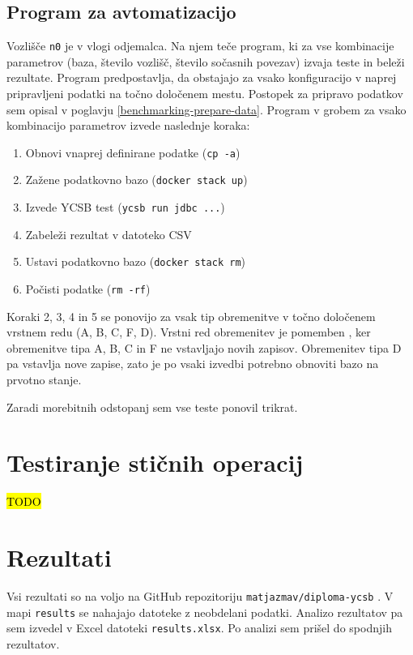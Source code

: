\documentclass[a4paper, 12pt]{book}
\begin{document}
\subsection{Program za avtomatizacijo}
Vozlišče \texttt{n0} je v vlogi odjemalca. Na njem teče program, ki za vse kombinacije parametrov (baza, število vozlišč, število sočasnih povezav) izvaja teste in beleži rezultate. Program predpostavlja, da obstajajo za vsako konfiguracijo v naprej pripravljeni podatki na točno določenem mestu. Postopek za pripravo podatkov sem opisal v poglavju \ref{benchmarking-prepare-data}. Program v grobem za vsako kombinacijo parametrov izvede naslednje koraka:
\begin{enumerate}
    \item Obnovi vnaprej definirane podatke (\texttt{cp -a})
    \item Zažene podatkovno bazo (\texttt{docker stack up})
    \item Izvede YCSB test (\texttt{ycsb run jdbc ...})
    \item Zabeleži rezultat v datoteko CSV
    \item Ustavi podatkovno bazo (\texttt{docker stack rm})
    \item Počisti podatke (\texttt{rm -rf})
\end{enumerate}

Koraki 2, 3, 4 in 5 se ponovijo za vsak tip obremenitve v točno določenem vrstnem redu (A, B, C, F, D). Vrstni red obremenitev je pomemben \cite{YCSB-core-workloads}, ker obremenitve tipa A, B, C in F ne vstavljajo novih zapisov. Obremenitev tipa D pa vstavlja nove zapise, zato je po vsaki izvedbi potrebno obnoviti bazo na prvotno stanje.

Zaradi morebitnih odstopanj sem vse teste ponovil trikrat.

\section{Testiranje stičnih operacij}
\hl{TODO}

\section{Rezultati}
Vsi rezultati so na voljo na GitHub repozitoriju \texttt{matjazmav/diploma-ycsb} \cite{matjazmav/diploma-ycsb}. V mapi \texttt{results} se nahajajo datoteke z neobdelani podatki. Analizo rezultatov pa sem izvedel v Excel datoteki \texttt{results.xlsx}. Po analizi sem prišel do spodnjih rezultatov.
\end{document}
